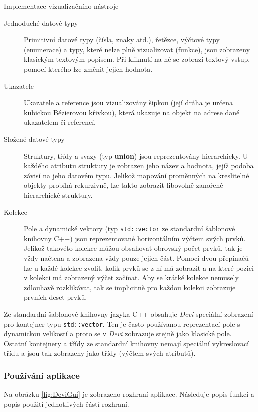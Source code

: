 \documentclass[bc,male,python,dept460]{diploma}						%
\begin{document}
\begin{section}{Implementace vizualizačního nástroje}
	\begin{description}
		\item[Jednoduché datové typy] Primitivní datové typy (čísla, znaky atd.), řetězce, výčtové typy (enumerace) a typy, které nelze plně vizualizovat
		(funkce), jsou zobrazeny klasickým textovým popisem. Při kliknutí na ně se zobrazí textový vstup, pomocí kterého lze změnit jejich hodnota.
		\item[Ukazatele] Ukazatele a reference jsou vizualizovány šipkou (její dráha je určena kubickou Bézierovou křivkou), která ukazuje na objekt na adrese
		dané ukazatelem či referencí. %
		\item[Složené datové typy] Struktury, třídy a svazy (typ \textbf{union}) jsou reprezentovány hierarchicky. U každého atributu struktury je zobrazen jeho
		název a hodnota, jejíž podoba závisí na jeho datovém typu. Jelikož mapování proměnných na kreslitelné objekty probíhá rekurzivně, lze takto zobrazit
		libovolně zanořené hierarchické struktury.
		\item[Kolekce] Pole a dynamické vektory (typ \texttt{std::vector} ze standardní šablonové knihovny C++) jsou reprezentované horizontálním výčtem svých prvků.
		Jelikož takovéto kolekce můžou obsahovat obrovský počet prvků, tak je vždy načtena a zobrazena vždy pouze jejich část. Pomocí dvou přepínačů lze u každé
		kolekce zvolit, kolik prvků se z ní má zobrazit a na které pozici v kolekci má zobrazený výčet začínat. Aby se krátké kolekce nemusely zdlouhavě rozklikávat,
		tak se implicitně pro každou kolekci zobrazuje prvních deset prvků.
	\end{description}
	
	Ze standardní šablonové knihovny jazyka C++ obsahuje \textit{Devi} speciální zobrazení pro kontejner typu \texttt{std::vector}. Ten je často používanou
	reprezentací pole s dynamickou velikostí a proto se v \textit{Devi} zobrazuje stejně jako klasické pole. Ostatní kontejnery a třídy ze standardní knihovny
	nemají speciální vykreslovací třídu a jsou tak zobrazeny jako třídy (výčtem svých atributů).
	
	\subsubsection{Používání aplikace}
	Na obrázku \ref{fig:DeviGui} je zobrazeno rozhraní aplikace. Následuje popis funkcí a popis použití jednotlivých částí rozhraní.
	

\end{section}
\end{document}
